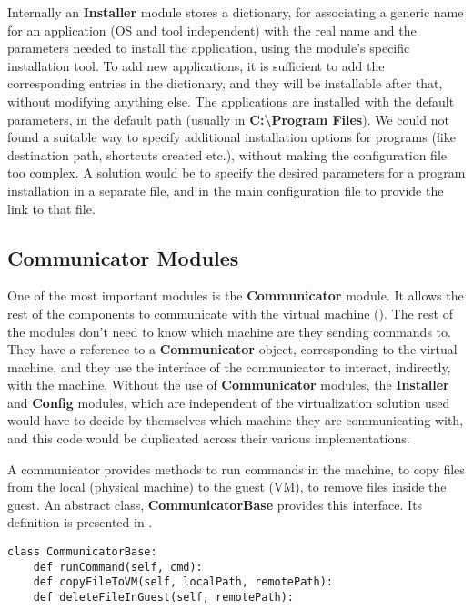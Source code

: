 Internally an \textbf{Installer} module stores a dictionary, for associating a
generic name for an application (OS and tool independent) with the real name
and the parameters needed to install the application, using the module's
specific installation tool. To add new applications, it is sufficient to add
the corresponding entries in the dictionary, and they will be installable after
that, without modifying anything else. The applications are installed with the
default parameters, in the default path (usually in
\textbf{C:{\textbackslash}Program Files}). We could not found a suitable way to
specify additional installation options for programs (like destination path,
shortcuts created etc.), without making the configuration file too complex. A
solution would be to specify the desired parameters for a program installation
in a separate file, and in the main configuration file to provide the link to
that file.


\subsection{Communicator Modules}
\label{sub-sec:communicators}

One of the most important modules is the \textbf{Communicator} module. It
allows the rest of the components to communicate with the virtual machine
().  The rest of the modules don't need to
know which machine are they sending commands to. They have a reference to a
\textbf{Communicator} object, corresponding to the virtual machine, and they
use the interface of the communicator to interact, indirectly, with the
machine. Without the use of \textbf{Communicator} modules, the
\textbf{Installer} and \textbf{Config} modules, which are independent of the
virtualization solution used would have to decide by themselves which machine
they are communicating with, and this code would be duplicated across their
various implementations.


A communicator provides methods to run commands in the machine, to copy files
from the local (physical machine) to the guest (VM), to remove files inside the
guest. An abstract class, \textbf{CommunicatorBase} provides this interface.
Its definition is presented in .

\lstset{language=Python,caption=Communicator methods,label=lst:comm-methods}
\begin{lstlisting}
class CommunicatorBase:
	def runCommand(self, cmd):
	def copyFileToVM(self, localPath, remotePath):
	def deleteFileInGuest(self, remotePath):
\end{lstlisting}

